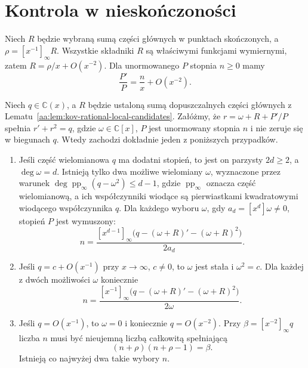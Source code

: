 \section{Kontrola w nieskończoności}

Niech $R$ będzie wybraną sumą
części głównych w punktach
skończonych, a
$\rho=[x^{-1}]_\infty R$.
Wszystkie składniki $R$
są właściwymi funkcjami
wymiernymi, zatem
$R=\rho/x+O(x^{-2})$.
Dla unormowanego $P$
stopnia $n\ge0$ mamy
\begin{equation}\label{aa:eq:kov-rational-logarithmic-infinity}
 \frac{P'}P=\frac n x+O(x^{-2}).
\end{equation}

\begin{lemat}
\label{aa:lem:kov-rational-infinity}
Niech $q\in\mathbb C(x)$,
a $R$ będzie ustaloną sumą
dopuszczalnych części głównych
z Lematu~\ref{aa:lem:kov-rational-local-candidates}.
Załóżmy, że
$r=\omega+R+P'/P$
spełnia $r'+r^2=q$,
gdzie $\omega\in\mathbb C[x]$,
$P$ jest unormowany stopnia $n$
i nie zeruje się w biegunach $q$.
Wtedy zachodzi dokładnie jeden
z poniższych przypadków.
\begin{enumerate}
\item Jeśli część wielomianowa
$q$ ma dodatni stopień,
to jest on parzysty $2d\ge2$,
a $\deg\omega=d$.
Istnieją tylko dwa możliwe
wielomiany $\omega$, wyznaczone
przez warunek
$\deg\operatorname{pp}_\infty(q-\omega^2)
\le d-1$, gdzie
$\operatorname{pp}_\infty$
oznacza część wielomianową,
a ich współczynniki wiodące
są pierwiastkami kwadratowymi
wiodącego współczynnika $q$.
Dla każdego wyboru $\omega$,
gdy $a_d=[x^d]\omega\ne0$,
stopień $P$ jest wymuszony:
\begin{equation}\label{aa:eq:kov-rational-degree-positive}
 n=\frac{[x^{d-1}]_\infty
 \bigl(q-(\omega+R)'-(\omega+R)^2\bigr)}
 {2a_d}.
\end{equation}
\item Jeśli $q=c+O(x^{-1})$
przy $x\to\infty$, $c\ne0$,
to $\omega$ jest stała
i $\omega^2=c$.
Dla każdej z dwóch możliwości
$\omega$ koniecznie
\begin{equation}\label{aa:eq:kov-rational-degree-constant}
 n=\frac{[x^{-1}]_\infty
 \bigl(q-(\omega+R)'-(\omega+R)^2\bigr)}
 {2\omega}.
\end{equation}
\item Jeśli $q=O(x^{-1})$,
to $\omega=0$ i koniecznie
$q=O(x^{-2})$.
Przy $\beta=[x^{-2}]_\infty q$
liczba $n$ musi być
nieujemną liczbą całkowitą
spełniającą
\begin{equation}\label{aa:eq:kov-rational-degree-vanishing}
 (n+\rho)(n+\rho-1)=\beta.
\end{equation}
Istnieją co najwyżej
dwa takie wybory $n$.
\end{enumerate}
\end{lemat}
